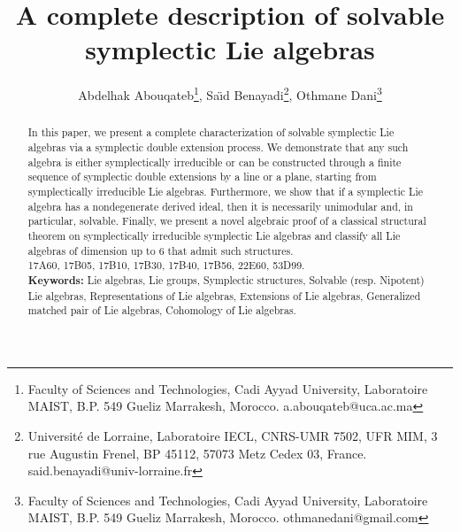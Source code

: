 \documentclass[final,1p,times,nopreprintline]{elsarticle}
\date{}
\theoremstyle{definition}
\numberwithin{equation}{section}
\numberwithin{equation}{section}
\begin{document}
\begin{frontmatter}
\title{A complete description of solvable symplectic Lie algebras}

\author{
	Abdelhak Abouqateb\footnote{Faculty of Sciences and Technologies, Cadi Ayyad University, Laboratoire MAIST,  B.P. 549 Gueliz Marrakesh, Morocco. a.abouqateb@uca.ac.ma}, Sa\"{\i}d Benayadi\footnote{ Universit\'e de Lorraine, Laboratoire IECL, CNRS-UMR 7502, UFR MIM, 3 rue Augustin Frenel, BP 45112, 57073 Metz Cedex 03, France. said.benayadi@univ-lorraine.fr }, Othmane Dani\footnote{Faculty of Sciences and Technologies, Cadi Ayyad University, Laboratoire MAIST, B.P. 549 Gueliz Marrakesh, Morocco. {othmanedani}@gmail.com   }
}
\begin{abstract}
In this paper, we present a complete characterization of solvable symplectic Lie algebras via a symplectic double extension process. We demonstrate that any such algebra is either symplectically irreducible or can be constructed through a finite sequence of symplectic double extensions by a line or a plane, starting from symplectically irreducible Lie algebras. Furthermore, we show that if a symplectic Lie algebra has a nondegenerate derived ideal, then it is necessarily unimodular and, in particular, solvable. Finally, we present a novel algebraic proof of a classical structural theorem on symplectically irreducible symplectic Lie algebras and classify all Lie algebras of dimension up to $6$ that admit such structures.\\
17A60, 17B05, 17B10, 17B30, 17B40, 17B56, 22E60, 53D99. \\
{\bf Keywords:} Lie algebras, Lie groups, Symplectic structures, Solvable (resp. Nipotent) Lie algebras, Representations of Lie algebras, Extensions of Lie algebras, Generalized matched pair of Lie algebras, Cohomology of Lie algebras. 
 
\end{abstract}
\end{frontmatter}
\end{document}
